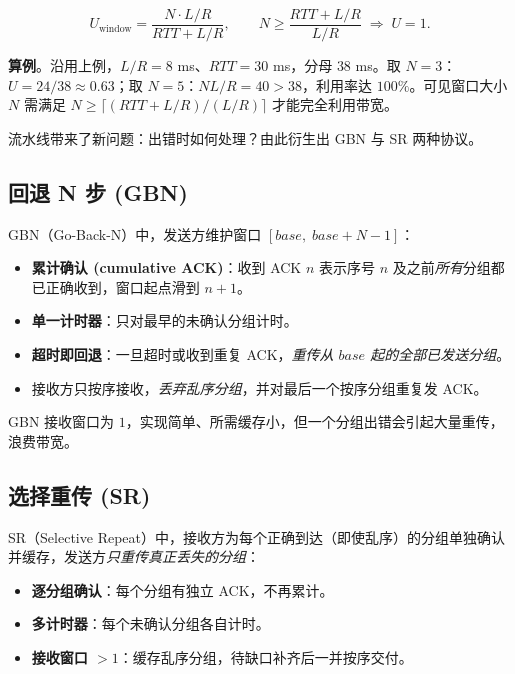 \begin{equation}
    U_{\text{window}} = \frac{N \cdot L/R}{RTT + L/R},
    \qquad N \ge \frac{RTT + L/R}{L/R} \;\Rightarrow\; U = 1.
    \label{eq:window}
\end{equation}

\textbf{算例}。沿用上例，$L/R = 8$ ms、$RTT = 30$ ms，分母 $38$ ms。取 $N = 3$：$U = 24/38 \approx 0.63$；取 $N = 5$：$N L/R = 40 > 38$，利用率达 $100\%$。可见窗口大小 $N$ 需满足 $N \ge \lceil (RTT + L/R)/(L/R) \rceil$ 才能完全利用带宽。

流水线带来了新问题：出错时如何处理？由此衍生出 GBN 与 SR 两种协议。

\subsection{回退 N 步 (GBN)}

GBN（Go-Back-N）中，发送方维护窗口 $[base,\; base+N-1]$：

\begin{itemize}
    \item \textbf{累计确认 (cumulative ACK)}：收到 ACK $n$ 表示序号 $n$ 及之前\emph{所有}分组都已正确收到，窗口起点滑到 $n+1$。
    \item \textbf{单一计时器}：只对最早的未确认分组计时。
    \item \textbf{超时即回退}：一旦超时或收到重复 ACK，\emph{重传从 $base$ 起的全部已发送分组}。
    \item 接收方只按序接收，\emph{丢弃乱序分组}，并对最后一个按序分组重复发 ACK。
\end{itemize}

GBN 接收窗口为 $1$，实现简单、所需缓存小，但一个分组出错会引起大量重传，浪费带宽。

\subsection{选择重传 (SR)}

SR（Selective Repeat）中，接收方为每个正确到达（即使乱序）的分组单独确认并缓存，发送方\emph{只重传真正丢失的分组}：

\begin{itemize}
    \item \textbf{逐分组确认}：每个分组有独立 ACK，不再累计。
    \item \textbf{多计时器}：每个未确认分组各自计时。
    \item \textbf{接收窗口 $>1$}：缓存乱序分组，待缺口补齐后一并按序交付。
\end{itemize}

